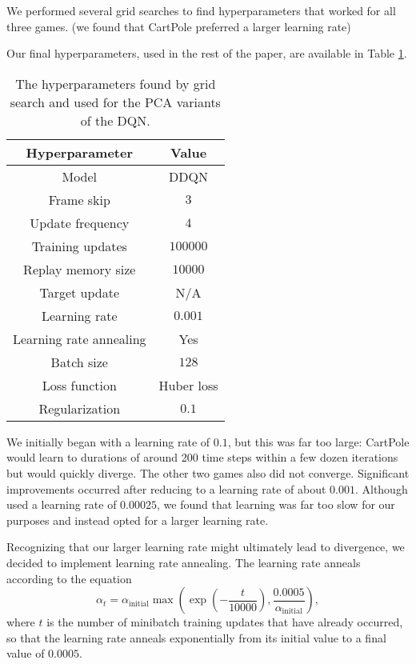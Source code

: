 \documentclass[11pt, twocolumn]{article}
\begin{document}
We performed several grid searches to find hyperparameters that worked
for all three games. (we found that CartPole preferred a larger
learning rate) 

Our final hyperparameters, used in the rest of the paper, are
available in Table \ref{tab:grid_search_hyperparameters}.

\begin{table}[!htbp] \centering
    \begin{tabular}{c|c} \toprule Hyperparameter & Value \\ \midrule
Model & DDQN \\ Frame skip & $3$ \\ Update frequency & $4$ \\ Training
updates & $100000$ \\ Replay memory size & $10000$ \\ Target update &
N/A \\ Learning rate & $0.001$ \\ Learning rate annealing & Yes \\
Batch size & $128$ \\ Loss function & Huber loss \\ Regularization &
$0.1$ \\ \bottomrule
    \end{tabular}
    \caption{The hyperparameters found by grid search and used for the
PCA variants of the DQN.}
    \label{tab:grid_search_hyperparameters}
\end{table}

We initially began with a learning rate of $0.1$, but this was far too
large: CartPole would learn to durations of around 200 time steps
within a few dozen iterations but would quickly diverge. The other two
games also did not converge. Significant improvements occurred after
reducing to a learning rate of about $0.001$. Although
\cite{mnih2013playing, mnih2015human} used a learning rate of
$0.00025$, we found that learning was far too slow for our purposes
and instead opted for a larger learning rate.

Recognizing that our larger learning rate might ultimately lead to
divergence, we decided to implement learning rate annealing. The
learning rate anneals according to the equation $$\alpha_t =
\alpha_\text{initial} \max\left(\exp\left(-\frac{t}{10000}\right),
\frac{0.0005}{\alpha_\text{initial}}\right),$$ where $t$ is the number
of minibatch training updates that have already occurred, so that the
learning rate anneals exponentially from its initial value to a final
value of $0.0005$.
\end{document}
